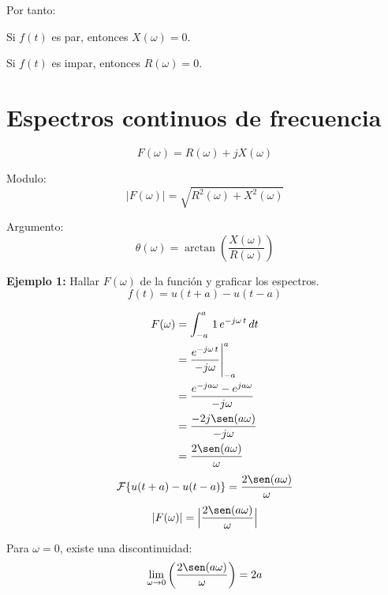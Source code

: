 Por tanto:

Si $f(t)$ es par, entonces $X(\omega)=0$.

Si $f(t)$ es impar, entonces $R(\omega)=0$.

\section{Espectros continuos de frecuencia}
\begin{equation*}
    F(\omega)=R(\omega)+jX(\omega)
\end{equation*}

Modulo:
\begin{equation*}
    |F(\omega)|=\sqrt{R^2(\omega)+X^2(\omega)}
\end{equation*}

Argumento:
\begin{equation*}
    \theta(\omega)=\arctan\left(\frac{X(\omega)}{R(\omega)}\right)
\end{equation*}

\textbf{Ejemplo 1:} Hallar $F(\omega)$ de la función y graficar los espectros.
\begin{equation*}
    f(t)=u(t+a)-u(t-a)
\end{equation*}
\begin{figure}[H]
    \centering
    
\end{figure}
\begin{equation*}
\begin{split}
    F(\omega)
        &=\int_{-a}^a\,1\,e^{-j\omega\,t}\,dt\\
        &=\frac{e^{-j\omega\,t}}{-j\omega}\Biggr|_{-a}^a\\
        &=\frac{e^{-ja\omega}-e^{ja\omega}}{-j\omega}\\
        &=\frac{-2j\sen(a\omega)}{-j\omega}\\
        &=\frac{2\sen(a\omega)}{\omega}\\
\end{split}
\end{equation*}
\begin{equation}
    \mathcal{F}\{u(t+a)-u(t-a)\}=\frac{2\sen(a\omega)}{\omega}
\end{equation}
\begin{equation*}
    |F(\omega)|=\Big|\frac{2\sen(a\omega)}{\omega}\Big|
\end{equation*}

Para $\omega=0$, existe una discontinuidad:
\begin{equation*}
    \lim_{\omega\to0}\left(\frac{2\sen(a\omega)}{\omega}\right)=2a
\end{equation*}
\begin{figure}[H]
    \centering
    \begin{minipage}{.4\textwidth}
        \centering
        
    \end{minipage}
    \begin{minipage}{.4\textwidth}
        \centering
        
    \end{minipage}
\end{figure}

